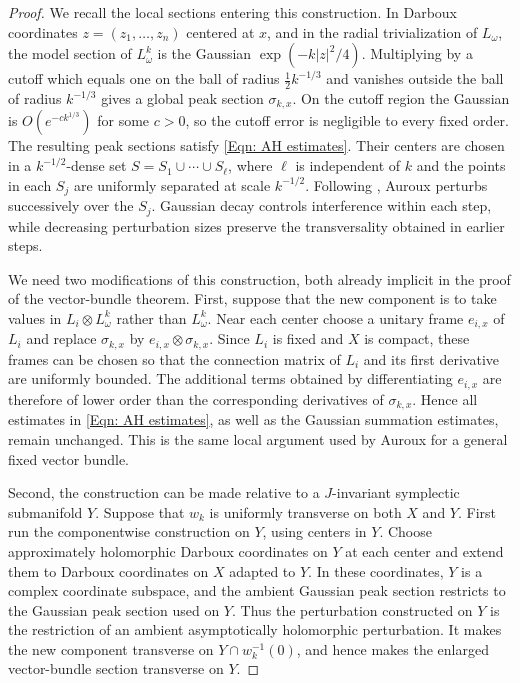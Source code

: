 \documentclass[11pt]{amsart}
\numberwithin{equation}{section}
\theoremstyle{plain}
\theoremstyle{definition}
\begin{document}
\begin{proof}
We recall the local sections entering this construction. In Darboux coordinates
$z=(z_1,\ldots,z_n)$ centered at $x$, and in the radial trivialization of
$L_\omega$, the model section of $L_\omega^k$ is the Gaussian $\exp(-k|z|^2/4)$.
Multiplying by a cutoff which equals one on the ball of radius $\frac12k^{-1/3}$
and vanishes outside the ball of radius $k^{-1/3}$ gives a global peak section
$\sigma_{k,x}$. On the cutoff region the Gaussian is $O(e^{-c k^{1/3}})$ for
some $c>0$, so the cutoff error is negligible to every fixed order. The
resulting peak sections satisfy \eqref{Eqn: AH estimates}. Their centers are
chosen in a $k^{-1/2}$-dense set $S=S_1\cup\cdots\cup S_\ell$, where $\ell$ is
independent of $k$ and the points in each $S_j$ are uniformly separated at scale
$k^{-1/2}$. Following \cite{Donaldson}, Auroux perturbs successively over the
$S_j$. Gaussian decay controls interference within each step, while decreasing
perturbation sizes preserve the transversality obtained in earlier steps.

We need two modifications of this construction, both already implicit in the
proof of the vector-bundle theorem. First, suppose that the new component is to
take values in $L_i\otimes L_\omega^k$ rather than $L_\omega^k$. Near each
center choose a unitary frame $e_{i,x}$ of $L_i$ and replace $\sigma_{k,x}$ by
$e_{i,x}\otimes\sigma_{k,x}$. Since $L_i$ is fixed and $X$ is compact, these
frames can be chosen so that the connection matrix of $L_i$ and its first
derivative are uniformly bounded. The additional terms obtained by
differentiating $e_{i,x}$ are therefore of lower order than the corresponding
derivatives of $\sigma_{k,x}$. Hence all estimates in \eqref{Eqn: AH estimates},
as well as the Gaussian summation estimates, remain unchanged. This is the same
local argument used by Auroux for a general fixed vector bundle.

Second, the construction can be made relative to a $J$-invariant symplectic
submanifold $Y$. Suppose that $w_k$ is uniformly transverse on both $X$ and
$Y$. First run the componentwise construction on $Y$, using centers in $Y$.
Choose approximately holomorphic Darboux coordinates on $Y$ at each center
and extend them to Darboux coordinates on $X$ adapted to $Y$. In these
coordinates, $Y$ is a complex coordinate subspace, and the ambient Gaussian
peak section restricts to the Gaussian peak section used on $Y$. Thus the
perturbation constructed on $Y$ is the restriction of an ambient
asymptotically holomorphic perturbation. It makes the new component
transverse on $Y\cap w_k^{-1}(0)$, and hence makes the enlarged vector-bundle
section transverse on $Y$.


\end{proof}
\end{document}
